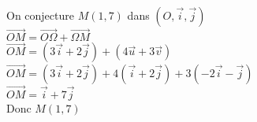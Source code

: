 On conjecture $M\left(1,7\right)$ dans $\left(O, \vec{i}, \vec{j}\right) $\\

$\overrightarrow{OM} = \overrightarrow{O \Omega} + \overrightarrow{\Omega M} $\\

$ \overrightarrow{OM} = \left(3\vec{i} + 2\vec{j}\right) + \left(4\overrightarrow{u} + 3\overrightarrow{v}\right) $\\

$ \overrightarrow{OM} = \left(3\vec{i} + 2\vec{j} \right) + 4\left(\vec{i} + 2\vec{j} \right) + 3\left(-2\vec{i} - \vec{j} \right) $\\

$ \overrightarrow{OM} = \vec{i} + 7\vec{j} $\\

Donc $M\left(1,7\right)$\\

\newpage

